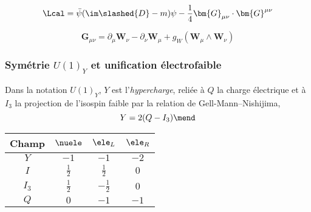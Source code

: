 \begin{equation}
\Lcal = \bar{\psi}(\im \slashed{D} - m) \psi - \frac{1}{4} \bm{G}_{\mu\nu} \cdot \bm{G}^{\mu\nu}
\end{equation}

\begin{equation}
\bm{G}_{\mu\nu} = \partial_\mu \bm{W}_\nu - \partial_\nu\bm{W}_\mu + g_W(\bm{W}_\mu \wedge \bm{W}_\nu)
\end{equation}

\subsubsection{Symétrie $U(1)_Y$ et unification électrofaible}\label{chapter-MS-MSSM-section-formalisme-subsec-EW-U1}
Dans la notation $U(1)_Y$, $Y$ est l'\emph{hypercharge}, reliée à $Q$ la charge électrique et à $I_3$ la projection de l'isospin faible par la relation de Gell-Mann--Nishijima,
\begin{equation}
Y = 2(Q-I_3)
\mend
\end{equation}


\begin{table}[h]
\centering
\begin{tabular}{cccc}
\toprule
Champ & $\nuele$ & $\ele_L$ & $\ele_R$\\
\midrule
$Y$ & $-1$ & $-1$ & $-2$ \\
$I$ & $\frac{1}{2}$ & $\frac{1}{2}$ & $0$ \\
$I_3$ & $\frac{1}{2}$ & $-\frac{1}{2}$ & $0$ \\
\midrule
$Q$ & $0$ & $-1$ & $-1$\\
\bottomrule
\end{tabular}
\end{table}